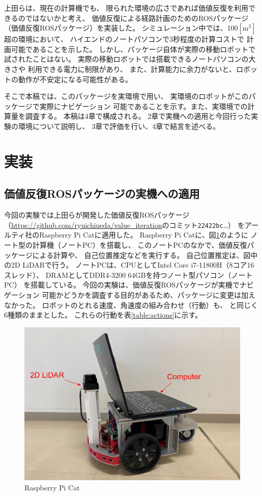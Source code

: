 \documentclass{jarticle}
\begin{document}
上田らは、現在の計算機でも、
限られた環境の広さであれば価値反復を利用できるのではないかと考え、
価値反復による経路計画のためのROSパッケージ
（価値反復ROSパッケージ）を実装した\cite{上田rsj2021}。
シミュレーション中では、100$\mathrm{[m^2]}$超の環境において、
ハイエンドのノートパソコンで3秒程度の計算コストで
計画可能であることを示した。
しかし、パッケージ自体が実際の移動ロボットで試されたことはない。
実際の移動ロボットでは搭載できるノートパソコンの大きさや
利用できる電力に制限があり、
また、計算能力に余力がないと、ロボットの動作が不安定になる可能性がある。

そこで本稿では、このパッケージを実環境で用い、
実環境のロボットがこのパッケージで実際にナビゲーション
可能であることを示す。また、実環境での計算量を調査する。
本稿は4章で構成される。
2章で実機への適用と今回行った実験の環境について説明し、
3章で評価を行い、4章で結言を述べる。

\section{実装}%

\subsection{価値反復ROSパッケージの実機への適用}

今回の実験では上田らが開発した価値反復ROSパッケージ
（\url{https://github.com/ryuichiueda/value_iteration}のコミット\texttt{22422bc}\dots）
\cite{上田rsj2021}をアールティ社のRaspberry Pi Catに適用した。
Raspberry Pi Catに、図\ref{fig:raspicat}のように
ノート型の計算機（ノートPC）を搭載し、
このノートPCのなかで、価値反復パッケージによる計算や、
自己位置推定などを実行する。
自己位置推定は、図中の2D LiDARで行う。
ノートPCは、CPUとしてIntel Core i7-11800H（8コア16スレッド）、
DRAMとしてDDR4-3200 64GBを持つノート型パソコン（ノートPC）
を搭載している。
今回の実験は、価値反復ROSパッケージが実機でナビゲーション
可能かどうかを調査する目的があるため、パッケージに変更は加えなかった。
ロボットのとれる速度、角速度の組み合わせ（行動）も、
\cite{上田rsj2021}と同じく6種類のままとした。
これらの行動を表\ref{table:actions}に示す。

\begin{figure}[bt]
  \centering
   \includegraphics[width=0.6\linewidth]{./figs/raspicat.png}
   \caption{Raspberry Pi Cat}
	\label{fig:raspicat}
\end{figure}
\end{document}

